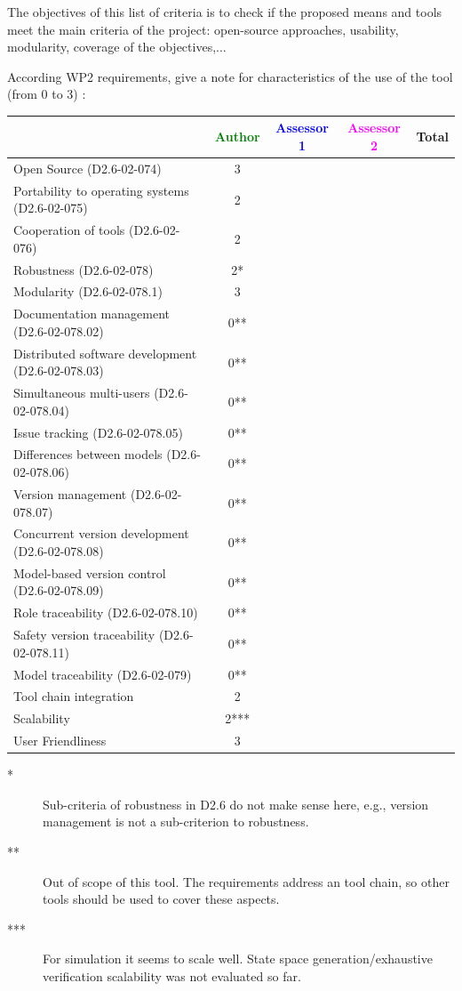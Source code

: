 The objectives of this list of criteria is to check if the proposed means and tools meet the main criteria of the project: open-source approaches, usability, modularity, coverage of the objectives,...

According WP2 requirements, give a note for characteristics of the use of the tool (from 0 to 3) :

\begin{tabular}{|l | c | c | c | c|}
\hline
& \textcolor{green}{Author} & \textcolor{blue}{Assessor 1} & \textcolor{magenta}{Assessor 2} & Total \\
\hline 
Open Source (D2.6-02-074) & 3& & &  \\
\hline 
Portability to operating systems (D2.6-02-075) & 2& & &  \\
\hline
Cooperation of tools (D2.6-02-076) & 2& & &  \\
\hline
Robustness (D2.6-02-078) & 2*& & & \\
\hline
Modularity (D2.6-02-078.1) &3 & & & \\
\hline
Documentation management (D2.6-02-078.02) &0** & & & \\
\hline
Distributed software development (D2.6-02-078.03)  &0** & & & \\
\hline
Simultaneous multi-users (D2.6-02-078.04)   &0** & & & \\
\hline
Issue tracking (D2.6-02-078.05) &0** & & & \\
\hline
Differences between models (D2.6-02-078.06) &0** & & & \\
\hline
Version management (D2.6-02-078.07) &0** & & & \\
\hline
Concurrent version development (D2.6-02-078.08) &0** & & & \\
\hline
Model-based version control (D2.6-02-078.09) &0** & & & \\
\hline
Role traceability (D2.6-02-078.10) &0** & & & \\
\hline
Safety version traceability (D2.6-02-078.11) &0** & & & \\
\hline
Model traceability (D2.6-02-079) &0** & & & \\
\hline
Tool chain integration &2 & & & \\
\hline
Scalability &2*** & & & \\
\hline
User Friendliness &3 & & & \\
\hline
\end{tabular}

\begin{author_comment}
\begin{description}
\item[*] Sub-criteria of robustness in D2.6 do not make sense here, e.g., version management is not a sub-criterion to robustness.
\item[**] Out of scope of this tool. The requirements address an tool chain, so other tools should be used to cover these aspects.
\item[***] For simulation it seems to scale well. State space generation/exhaustive verification scalability was not evaluated so far.
\end{description}
\end{author_comment}


